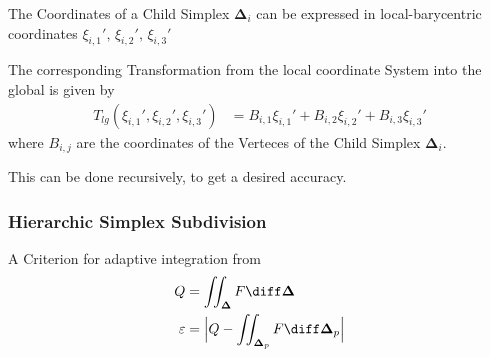 \documentclass{mitschrift}
\newcommand{\simplex}{\boldsymbol{\Delta}}
\begin{document}
The Coordinates of a Child Simplex $\simplex_i$ can be expressed in local-barycentric coordinates $\xi_{i,1}',\, \xi_{i,2}',\, \xi_{i,3}'$

The corresponding Transformation from the local coordinate System into the global is given by \begin{align}
   T_{lg}(\xi_{i,1}', \xi_{i,2}', \xi_{i,3}') &= B_{i,1}\xi_{i,1}' + B_{i,2}\xi_{i,2}' + B_{i,3} \xi_{i,3}'
\end{align} where $B_{i,j}$ are the coordinates of the Verteces of the Child Simplex $\simplex_i$.

This can be done recursively, to get a desired accuracy.
%



\subsubsection{Hierarchic Simplex Subdivision}

A Criterion for adaptive integration from \cite{gonnetReviewErrorEstimation2012}\begin{align}
    Q &= \iint_{\simplex} F \diff \simplex \\
    \varepsilon &= \Bigl\vert Q - \iint_{\simplex_p} F \diff \simplex_p \Bigr\vert
\end{align}
\end{document}
